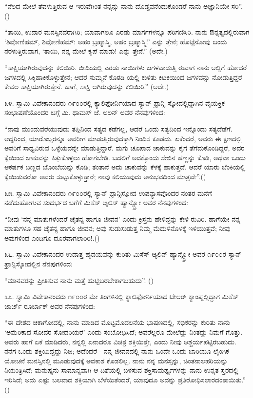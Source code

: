 “ನೆಲದ ಮೇಲೆ ತೆವಳುತ್ತಿರುವ ಆ ಇರುವೆಗಿಂತ ನನ್ನನ್ನು ನಾನು ದೊಡ್ಡವನೆಂದುಕೊಂಡರೆ ನಾನು ಅಜ್ಞಾನಿಯೇ ಸರಿ”. ()

“ತಾಯಿ, ಉದಾರ ಮನಸ್ಸಿನವರಾಗಿರಿ; ಯಾವಾಗಲೂ ಎರಡು ಮಾರ್ಗಗಳನ್ನೂ ಪರಿಗಣಿಸಿರಿ. ನಾನು ಔನ್ನತ್ಯದಲ್ಲಿರುವಾಗ ‘ಶಿವೋಣಿಹಮ್​, ಶಿವೋಣಿಹಮ್​: ಅಹಂ ಬ್ರಹ್ಮಾಸ್ಮಿ, ಅಹಂ ಬ್ರಹ್ಮಾಸ್ಮಿ!’ ಎನ್ನು ತ್ತೇನೆ; ಹೊಟ್ಟೆನೋವು ಬಂದು ನರಳುತ್ತಿರುವಾಗ, ‘ತಾಯಿ, ನನ್ನ ಮೇಲೆ ಕೃಪೆ ಮಾಡು! ಎನ್ನು ತ್ತೇನೆ.” (ಅದೇ.)

“ಸಾಕ್ಷಿಯಾಗಿರುವುದನ್ನು ಕಲಿಯಿರಿ. ಬೀದಿಯಲ್ಲಿ ಎರಡು ನಾಯಿಗಳು ಜಗಳವಾಡುತ್ತಿ ರುವಾಗ ನಾನು ಅಲ್ಲಿಗೆ ಹೋದರೆ ಜಗಳದಲ್ಲಿ ಸಿಕ್ಕಿಹಾಕಿಕೊಳ್ಳುತ್ತೇನೆ; ಆದರೆ ಸುಮ್ಮನೆ ಕೊಠಡಿ ಯಲ್ಲಿ ಕುಳಿತು ಕಿಟಕಿಯಿಂದ ಜಗಳವನ್ನು ನೋಡುತ್ತಿದ್ದರೆ ಕೇವಲ ಸಾಕ್ಷಿಯಾಗಿರುತ್ತೇನೆ. ಹಾಗೆ, ಸಾಕ್ಷಿ ಆಗಿರುವುದನ್ನು ಕಲಿಯಿರಿ.” (ಅದೇ.)

೩೪. ಸ್ವಾಮಿ ವಿವೇಕಾನಂದರು ೧೯೦೦ರಲ್ಲಿ ಕ್ಯಾಲಿಫೋರ್ನಿಯಾದ ಸ್ಯಾನ್ ಫ್ರಾನ್ಸಿ ಸ್ಕೋದಲ್ಲಿದ್ದಾಗಿನ ವೈಯಕ್ತಿಕ ಸಂಭಾಷಣೆಯೊಂದರ ಬಗ್ಗೆ ಮಿ. ಥಾಮಸ್ ಜೆ. ಅಲನ್ ಅವರ ನೆನಪುಗಳಿಂದ:

“ನಾವು ಮುಂದುವರೆಯುವುದು ತಪ್ಪಿನಿಂದ ಸತ್ಯದ ಕಡೆಗಲ್ಲ, ಆದರೆ ಒಂದು ಸತ್ಯದಿಂದ ಇನ್ನೊಂದು ಸತ್ಯದೆಡೆಗೆ. ಆದ್ದರಿಂದ, ಯಾರೊಬ್ಬರನ್ನೂ ಅವರೀಗ ಮಾಡುತ್ತಿರುವುದಕ್ಕಾಗಿ ನಿಂದಿಸ ಕೂಡದು. ಏಕೆಂದರೆ, ಅವರು ಈ ಕ್ಷಣದಲ್ಲಿ ಅವರಿಗೆ ಸಾಧ್ಯವಿರುವ ಒಳ್ಳೆಯದನ್ನೇ ಮಾಡುತ್ತಿದ್ದಾರೆ. ಮಗು ಚೂಪಾದ ಚಾಕುವನ್ನು ಕೈಗೆ ತೆಗೆದುಕೊಂಡಿದ್ದರೆ, ಅದರ ಕೈಯಿಂದ ಚಾಕುವನ್ನು ಕಿತ್ತುಕೊಳ್ಳಲು ಹೋಗಬೇಡಿ. ಬದಲಿಗೆ ಅದಕ್ಕೊಂದು ಸೇಬಿನ ಹಣ್ಣನ್ನು ಕೊಡಿ, ಅಥವಾ ಒಂದು ಆಕರ್ಷಕ ಬಣ್ಣದ ಬೊಂಬೆಯನ್ನು ಕೊಡಿ; ತಂತಾನೆ ಅದು ಚಾಕುವನ್ನು ಕೆಳಕ್ಕೆ ಹಾಕುತ್ತದೆ. ಆದರೆ ಯಾರು ಬೆಂಕಿಯಲ್ಲಿ ಕೈಯಿಡುವರೋ ಅವರು ಸುಟ್ಟುಕೊಳ್ಳುತ್ತಾರೆ; ನಾವು ಕಲಿಯುವುದು ಅನುಭವದಿಂದ ಮಾತ್ರವೇ”.()

೩೫. ಸ್ವಾಮಿ ವಿವೇಕಾನಂದರು ೧೯೦೦ರಲ್ಲಿ ಸ್ಯಾನ್ ಫ್ರಾನ್ಸಿಸ್ಕೋದ ಉಪನ್ಯಾಸವೊಂದರ ನಂತರ ಮನೆಗೆ ನಡೆದುಹೋಗುವ ಸಂದರ್ಭದ ಬಗೆಗೆ ಮಿಸೆಸ್ ಆ್ಯಲಿಸ್ ಹ್ಯಾನ್ಸ್ಬ್ರೋ ಅವರ ನೆನಪುಗಳಿಂದ:

“ನೀವು ‘ನನ್ನ ಮಾತುಗಳೆಂದರೆ ಚೈತನ್ಯ ಹಾಗೂ ಜೀವನ’ ಎಂದು ಕ್ರಿಸ್ತನು ಹೇಳಿದ್ದನ್ನು ಕೇಳಿ ರುವಿರಿ. ಹಾಗೆಯೇ ನನ್ನ ಮಾತುಗಳೂ ಸಹ ಚೈತನ್ಯ ಹಾಗೂ ಜೀವನ; ಅವು ಸುಡುಸುಡುತ್ತ ನಿಮ್ಮ ಮೆದುಳಿನೊಳಕ್ಕೆ ಇಳಿಯುತ್ತವೆ; ನೀವು ಅವುಗಳಿಂದ ಎಂದಿಗೂ ದೂರವಾಗಲಾರಿರಿ!.()

೩೬. ಸ್ವಾಮಿ ವಿವೇಕಾನಂದರ ಉದಾತ್ತ ಹೃದಯವನ್ನು ಕುರಿತು ಮಿಸೆಸ್ ಆ್ಯಲಿನ್ ಹ್ಯಾನ್ಸ್ಬ್ರೋ ಅವರ ೧೯೦೦ರ ಸ್ಯಾನ್ ಫ್ರಾನ್ಸಿಸ್ಕೋದಲ್ಲಿನ ನೆನಪುಗಳಿಂದ:

“ಮಾನವರನ್ನು ಪ್ರೀತಿಸುವ ನಾನು ಮತ್ತೆ ಹುಟ್ಟಿಬರಬೇಕಾಗಬಹುದು”. ()

೩೭. ಸ್ವಾಮಿ ವಿವೇಕಾನಂದರು ೧೯೦೦ರ ಮೇ ತಿಂಗಳಿನಲ್ಲಿ ಕ್ಯಾಲಿಫೋರ್ನಿಯಾದ ಟೇಲರ್ ಕ್ಯಾಂಪ್ನಲ್ಲಿದ್ದಾಗ ಮಿಸೆಸ್ ಜಾರ್ಜ್ ರೂರ್ಬಾಕ್ ಅವರ ನೆನಪುಗಳಿಂದ:

“ಈ ದೇಶದ ಚಿಕಾಗೋದಲ್ಲಿ, ನಾನು ಮಾಡಿದ ಮೊಟ್ಟಮೊದಲನೆಯ ಭಾಷಣದಲ್ಲಿ, ಸಭಿಕರನ್ನು ಕುರಿತು ನಾನು ‘ಅಮೆರಿಕಾದ ಸೋದರ ಸೋದರಿಯರೆ’ ಎಂದು ಸಂಬೋಧಿಸಿದೆ; ಅವರೆಲ್ಲರೂ ಮೇಲೆದ್ದು ನಿಂತದ್ದು ನಿಮಗೆ ಗೊತ್ತು. ಅವರು ಹಾಗೆ ಏಕೆ ಮಾಡಿದರು, ನನ್ನಲ್ಲಿ ಏನಾದರೂ ವಿಚಿತ್ರ ಶಕ್ತಿಯಿತ್ತೇ, ಎಂದು ನೀವು ಆಶ್ಚರ್ಯಪಟ್ಟಿರಬಹುದು. ನನೆಗ ಒಂದು ಶಕ್ತಿಯಿದ್ದದ್ದು ನಿಜ; ಅದೆಂದರೆ - ನನ್ನ ಜೀವನದಲ್ಲಿ ನಾನು ಒಂದೇ ಒಂದು ಬಾರಿಯೂ ಲೈಂಗಿಕ ಯೋಚನೆ ಮನಸ್ಸಿನಲ್ಲಿ ಮೂಡುವುದಕ್ಕೆ ಅವಕಾಶ ಕೊಡಲಿಲ್ಲ. ನಾನು ನನ್ನ ಮನಸ್ಸನ್ನು, ಚಿಂತನಾಲಹರಿಯನ್ನು ನಿಯಂತ್ರಿಸಿದೆ; ಮನುಷ್ಯನು ಸಾಮಾನ್ಯವಾಗಿ ಆ ದಿಶೆಯಲ್ಲಿ ಬಳಸುವ ಶಕ್ತಿಸಾಮರ್ಥ್ಯಗಳನ್ನು ನಾನು ಉನ್ನತ ಸ್ತರದಲ್ಲಿ ಇರಿಸಿದೆ; ಅದು ಎಷ್ಟು ಬಲವಾದ ಶಕ್ತಿಯಾಗಿ ಬೆಳೆಯಿತೆಂದರೆ, ಯಾವುದೂ ಅದನ್ನು ಪ್ರತಿರೋಧಿಸಲಾರದಂತಾಯಿತು.” ()

